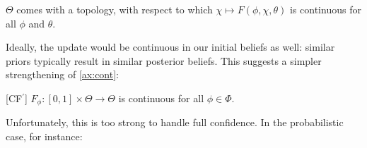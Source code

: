 \begin{CFaxioms}[nosep]
	\item
	$\Theta$ comes with a topology, with respect to which
	$
	\chi \mapsto F(\phi,\chi,\theta)
	$
	is continuous
	for all $\phi$ and $\theta$.
	\label{ax:cont}
\end{CFaxioms}



Ideally, the update would be continuous in our initial
beliefs as well: similar priors typically result
in similar posterior beliefs.
This suggests a simpler strengthening of \cref{ax:cont}:

\begin{CFaxioms}[nosep]
	\item
	[CF{\the\numexpr\value{CFaxiomsi}\relax}${^\prime}$]
	$F_\phi : [0,1] \times \Theta \to \Theta$ is continuous
	for all $\phi \in \Phi$.
	\label{ax:cont-strong}
\end{CFaxioms}

Unfortunately, this is too strong to handle full confidence.
In the probabilistic case, for instance:


